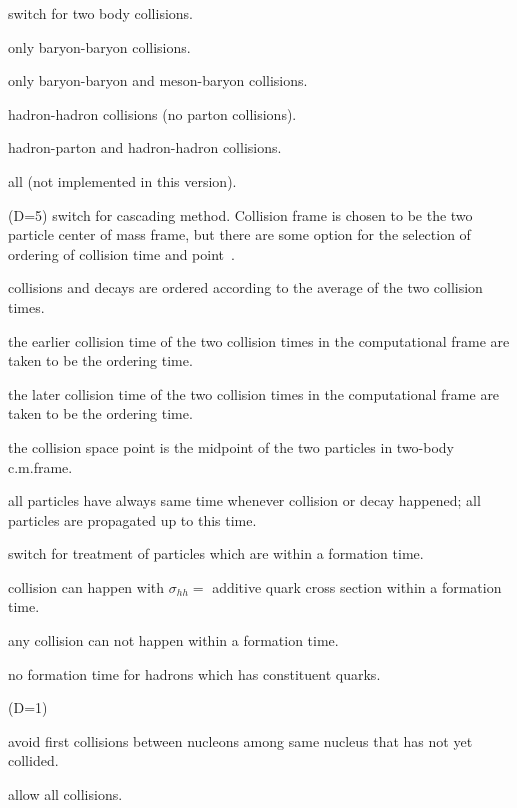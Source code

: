 \documentclass[]{article}
\newenvironment{entry}%
{\begin{list}{}{\setlength{\topsep}{0mm} \setlength{\itemsep}{0mm}
\setlength{\parskip}{0mm} \setlength{\parsep}{0mm}
\setlength{\leftmargin}{20mm} \setlength{\rightmargin}{0mm}
\setlength{\labelwidth}{18mm} \setlength{\labelsep}{2mm}}}%
{\end{list}}
\newenvironment{subentry}%
{\begin{list}{}{\setlength{\topsep}{0mm} \setlength{\itemsep}{0mm}
\setlength{\parskip}{0mm} \setlength{\parsep}{0mm}
\setlength{\leftmargin}{10mm} \setlength{\rightmargin}{0mm}
\setlength{\labelwidth}{18mm} \setlength{\labelsep}{2mm}}}%
{\end{list}}
\newcommand{\itemt}[1]{\item[{\tt #1}\hfill]}
\begin{document}
\begin{entry}

\itemt{mstc(51)(D=3)  :} switch for two body  collisions.
    \begin{subentry}
           \itemt{$=0$ :} only baryon-baryon collisions.
           \itemt{$=1$ :} only baryon-baryon  and  meson-baryon collisions.
           \itemt{$=2$ :} hadron-hadron collisions (no parton collisions).
           \itemt{$=3$ :} hadron-parton and  hadron-hadron collisions.
           \itemt{$=4$ :} all (not implemented in this version).
    \end{subentry}

\itemt{mstc(52) :} (D=5) switch for cascading method.
    Collision frame is chosen to be the two particle center of mass frame,
    but there are some option for the selection of ordering
    of collision time and point~\cite{zpc,bin1}.
 \begin{subentry}
    \itemt{$=2$:} collisions and decays are ordered according to the
                  average of the two collision times.
    \itemt{$=3$:} the earlier collision time of the two collision times
                  in the computational frame are taken to be the ordering time.
    \itemt{$=4$:} the later collision time of the two collision times
                  in the computational frame are taken to be the ordering time.
    \itemt{$=5$:} the collision space point is the midpoint of
                  the two particles in two-body c.m.frame.
    \itemt{$=11$:} all particles have always same time whenever collision
                   or decay happened; all particles are propagated up
                   to this time.
  \end{subentry}

\itemt{mstc(53)(D=1) :} switch for treatment of particles which are within a
                         formation time.
 \begin{subentry}
   \itemt{$=1$:} collision can happen with $\sigma_{hh}=$ additive quark
                 cross section within a formation time.
    \itemt{$=2$:}any collision can not happen within a formation time.
    \itemt{$=3$:}no formation time for hadrons which has constituent quarks.
 \end{subentry}

\itemt{mstc(54) :} (D=1)
  \begin{subentry}
    \itemt{$=1$ :} avoid first collisions between nucleons among same nucleus
                   that has not yet collided.
   \itemt{$=0$ :}  allow all collisions.
  \end{subentry}


\end{entry}
\end{document}
